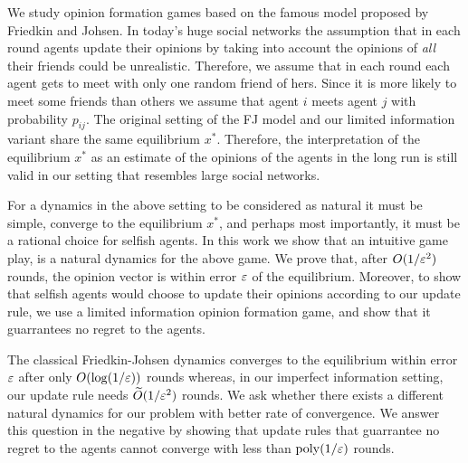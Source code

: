 We study opinion formation games based on the famous model proposed by Friedkin
and Johsen.  In today's huge social networks the assumption that in each round
agents update their opinions by taking into account the opinions of
\emph{all} their friends could be unrealistic. Therefore, we assume that in
each round each agent gets to meet with only one random friend of
hers.  Since it is more likely to meet some friends than others we assume
that agent $i$ meets agent $j$ with probability $p_{ij}$.
The original setting of the FJ model and our limited information
variant share the same equilibrium $x^*$.  Therefore, the interpretation
of the equilibrium $x^*$ as an estimate of the opinions of the agents in the long
run is still valid in our setting that resembles large social networks.


For a dynamics in the above setting to be considered as natural it must be
simple, converge to the equilibrium $x^*$, and perhaps most importantly, it
must be a rational choice for selfish agents.  In this work we show that
an intuitive game play, is a natural dynamics for the above game.
We prove that, after $O(1/\varepsilon^2)$ rounds, the opinion vector
is within error $\varepsilon$  of the equilibrium. Moreover, to show that selfish
agents would choose to update their opinions according to our update rule,
we use a limited information opinion formation game, and show that it
guarrantees no regret to the agents.


The classical Friedkin-Johsen dynamics converges to the equilibrium within
error $\varepsilon$ after only $O(\log(1/\varepsilon))$ rounds whereas, in our imperfect
information setting, our update rule needs $\widetilde{O}(1/\varepsilon^2)$ rounds.
We ask whether there exists a different natural dynamics for our problem
with better rate of convergence.  We answer this question in the negative
by showing that update rules that guarrantee no regret to the agents cannot
converge with less than $\mathrm{poly}(1/\varepsilon)$ rounds.
